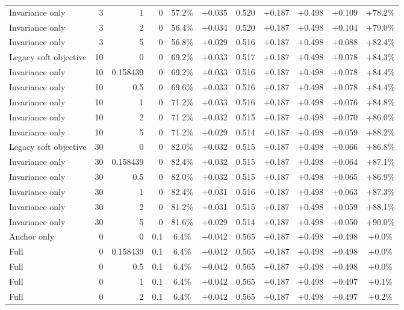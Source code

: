 \begin{table}[htbp]
\begin{tabular}{lrrrccccccc}
Invariance only & 3 & 1 & 0 & 57.2\% & +0.035 & 0.520 & +0.187 & +0.498 & +0.109 & +78.2\% \\
Invariance only & 3 & 2 & 0 & 56.4\% & +0.034 & 0.520 & +0.187 & +0.498 & +0.104 & +79.0\% \\
Invariance only & 3 & 5 & 0 & 56.8\% & +0.029 & 0.516 & +0.187 & +0.498 & +0.088 & +82.4\% \\
Legacy soft objective & 10 & 0 & 0 & 69.2\% & +0.033 & 0.517 & +0.187 & +0.498 & +0.078 & +84.3\% \\
Invariance only & 10 & 0.158439 & 0 & 69.2\% & +0.033 & 0.516 & +0.187 & +0.498 & +0.078 & +84.4\% \\
Invariance only & 10 & 0.5 & 0 & 69.6\% & +0.033 & 0.516 & +0.187 & +0.498 & +0.078 & +84.4\% \\
Invariance only & 10 & 1 & 0 & 71.2\% & +0.033 & 0.516 & +0.187 & +0.498 & +0.076 & +84.8\% \\
Invariance only & 10 & 2 & 0 & 71.2\% & +0.032 & 0.515 & +0.187 & +0.498 & +0.070 & +86.0\% \\
Invariance only & 10 & 5 & 0 & 71.2\% & +0.029 & 0.514 & +0.187 & +0.498 & +0.059 & +88.2\% \\
Legacy soft objective & 30 & 0 & 0 & 82.0\% & +0.032 & 0.515 & +0.187 & +0.498 & +0.066 & +86.8\% \\
Invariance only & 30 & 0.158439 & 0 & 82.4\% & +0.032 & 0.515 & +0.187 & +0.498 & +0.064 & +87.1\% \\
Invariance only & 30 & 0.5 & 0 & 82.0\% & +0.032 & 0.515 & +0.187 & +0.498 & +0.065 & +86.9\% \\
Invariance only & 30 & 1 & 0 & 82.4\% & +0.031 & 0.516 & +0.187 & +0.498 & +0.063 & +87.3\% \\
Invariance only & 30 & 2 & 0 & 81.2\% & +0.031 & 0.515 & +0.187 & +0.498 & +0.059 & +88.1\% \\
Invariance only & 30 & 5 & 0 & 81.6\% & +0.029 & 0.514 & +0.187 & +0.498 & +0.050 & +90.0\% \\
Anchor only & 0 & 0 & 0.1 & 6.4\% & +0.042 & 0.565 & +0.187 & +0.498 & +0.498 & +0.0\% \\
Full & 0 & 0.158439 & 0.1 & 6.4\% & +0.042 & 0.565 & +0.187 & +0.498 & +0.498 & +0.0\% \\
Full & 0 & 0.5 & 0.1 & 6.4\% & +0.042 & 0.565 & +0.187 & +0.498 & +0.498 & +0.0\% \\
Full & 0 & 1 & 0.1 & 6.4\% & +0.042 & 0.565 & +0.187 & +0.498 & +0.497 & +0.1\% \\
Full & 0 & 2 & 0.1 & 6.4\% & +0.042 & 0.565 & +0.187 & +0.498 & +0.497 & +0.2\% \\

\end{tabular}
\end{table}
